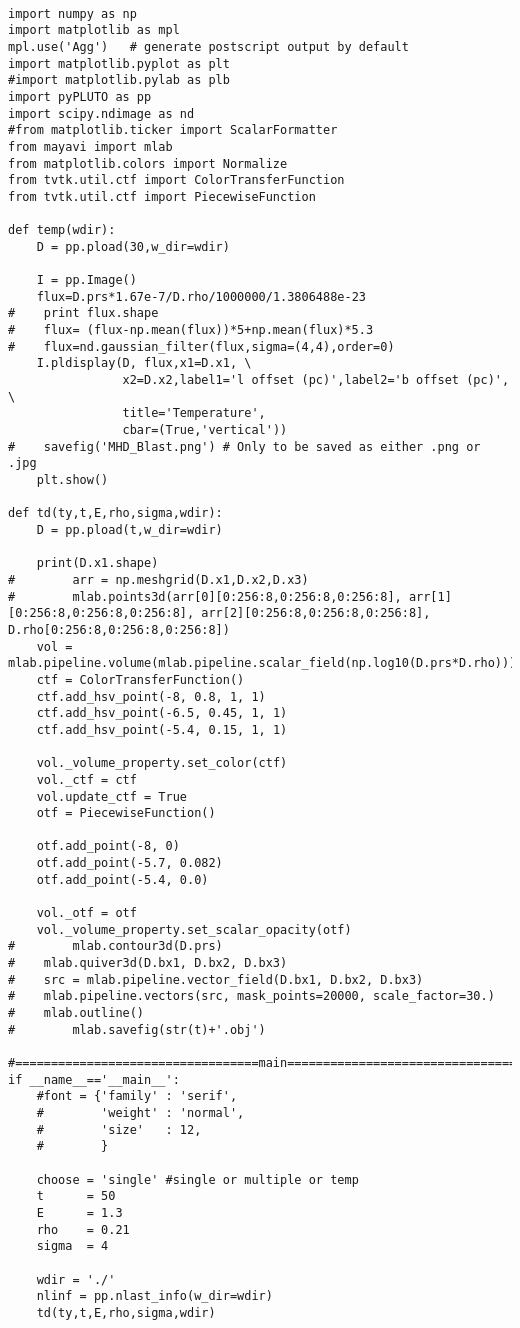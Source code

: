 \begin{lstlisting}

import numpy as np
import matplotlib as mpl
mpl.use('Agg')   # generate postscript output by default
import matplotlib.pyplot as plt
#import matplotlib.pylab as plb
import pyPLUTO as pp
import scipy.ndimage as nd
#from matplotlib.ticker import ScalarFormatter
from mayavi import mlab
from matplotlib.colors import Normalize
from tvtk.util.ctf import ColorTransferFunction
from tvtk.util.ctf import PiecewiseFunction

def temp(wdir):
    D = pp.pload(30,w_dir=wdir)

    I = pp.Image()
    flux=D.prs*1.67e-7/D.rho/1000000/1.3806488e-23
#    print flux.shape
#    flux= (flux-np.mean(flux))*5+np.mean(flux)*5.3
#    flux=nd.gaussian_filter(flux,sigma=(4,4),order=0)
    I.pldisplay(D, flux,x1=D.x1, \
                x2=D.x2,label1='l offset (pc)',label2='b offset (pc)',                                    \
                title='Temperature',
                cbar=(True,'vertical'))
#    savefig('MHD_Blast.png') # Only to be saved as either .png or .jpg
    plt.show()

def td(ty,t,E,rho,sigma,wdir):
    D = pp.pload(t,w_dir=wdir)

    print(D.x1.shape)
#        arr = np.meshgrid(D.x1,D.x2,D.x3)
#        mlab.points3d(arr[0][0:256:8,0:256:8,0:256:8], arr[1][0:256:8,0:256:8,0:256:8], arr[2][0:256:8,0:256:8,0:256:8], D.rho[0:256:8,0:256:8,0:256:8])
    vol = mlab.pipeline.volume(mlab.pipeline.scalar_field(np.log10(D.prs*D.rho)))
    ctf = ColorTransferFunction()
    ctf.add_hsv_point(-8, 0.8, 1, 1)
    ctf.add_hsv_point(-6.5, 0.45, 1, 1)
    ctf.add_hsv_point(-5.4, 0.15, 1, 1)

    vol._volume_property.set_color(ctf)
    vol._ctf = ctf
    vol.update_ctf = True
    otf = PiecewiseFunction()

    otf.add_point(-8, 0)
    otf.add_point(-5.7, 0.082)
    otf.add_point(-5.4, 0.0)

    vol._otf = otf
    vol._volume_property.set_scalar_opacity(otf)
#        mlab.contour3d(D.prs)
#    mlab.quiver3d(D.bx1, D.bx2, D.bx3)
#    src = mlab.pipeline.vector_field(D.bx1, D.bx2, D.bx3)
#    mlab.pipeline.vectors(src, mask_points=20000, scale_factor=30.)
#    mlab.outline()
#        mlab.savefig(str(t)+'.obj')

#==================================main========================================
if __name__=='__main__':
    #font = {'family' : 'serif',
    #        'weight' : 'normal',
    #        'size'   : 12,
    #        }

    choose = 'single' #single or multiple or temp
    t      = 50
    E      = 1.3
    rho    = 0.21
    sigma  = 4

    wdir = './'
    nlinf = pp.nlast_info(w_dir=wdir)
    td(ty,t,E,rho,sigma,wdir)

\end{lstlisting}


